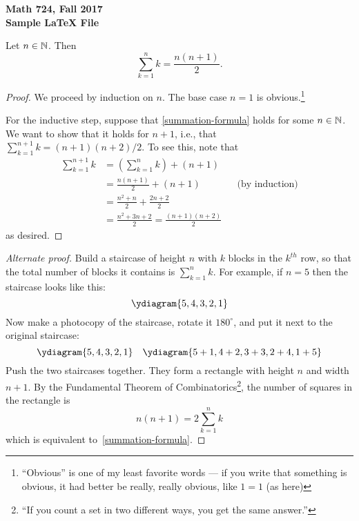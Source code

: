 


{\bf Math 724, Fall 2017\\
Sample LaTeX File}


\begin{theorem}
Let $n\in\mathbb{N}$.  Then
\begin{equation} \label{summation-formula}
\sum_{k=1}^n k=\frac{n(n+1)}{2}.
\end{equation}
\end{theorem}
\begin{proof}
We proceed by induction on $n$.  The base case $n=1$ is obvious.\footnote{``Obvious'' is one of my least favorite words --- if you write that something is obvious, it had better be really, really obvious, like $1=1$ (as here)}

For the inductive step, suppose that \eqref{summation-formula} holds for some $n\in\mathbb{N}$.  We want to show that it holds for $n+1$, i.e., that
$\sum_{k=1}^{n+1} k=(n+1)(n+2)/2$.  To see this, note that
\begin{align*}
\sum_{k=1}^{n+1} k
&= \left(\sum_{k=1}^nk\right)+(n+1)\\
&= \frac{n(n+1)}{2}+(n+1) && \text{(by induction)}\\
&= \frac{n^2+n}{2}+\frac{2n+2}{2}\\
&= \frac{n^2+3n+2}{2} = \frac{(n+1)(n+2)}{2}
\end{align*}
as desired.
\end{proof}

\begin{proof}[Alternate proof]
Build a staircase of height $n$ with $k$ blocks in the $k^{th}$ row, so that the total number of blocks it contains is $\sum_{k=1}^nk$.  For example, if $n=5$ then the staircase looks like this:
\[\ydiagram{5,4,3,2,1}\]
Now make a photocopy of the staircase, rotate it $180^\circ$, and put it next to the original staircase:
\[\ydiagram{5,4,3,2,1} \quad
\ydiagram{5+1,4+2,3+3,2+4,1+5}\]
Push the two staircases together.  They form a rectangle with height $n$ and width $n+1$.  By the Fundamental Theorem of Combinatorics\footnote{``If you count a set in two different ways, you get the same answer.''}, the number of squares in the rectangle is
\[n(n+1)=2\sum_{k=1}^nk\]
which is equivalent to~\eqref{summation-formula}.
\end{proof}

